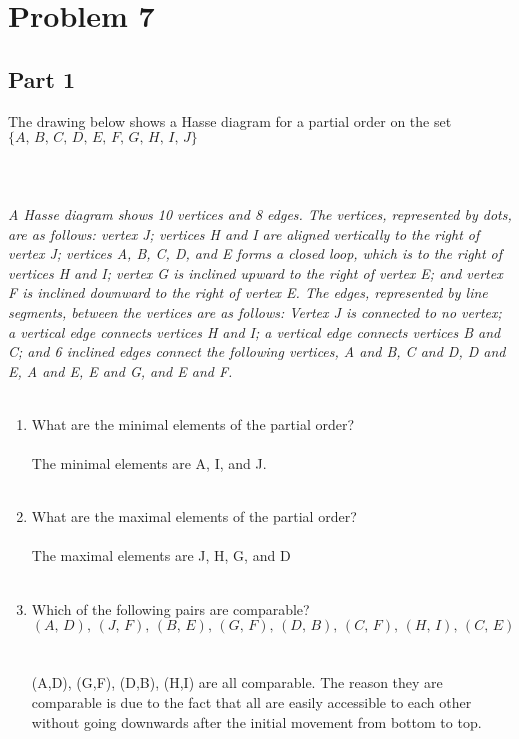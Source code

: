 \section*{Problem 7}
\subsection*{Part 1} The drawing below shows a Hasse diagram for a partial order on the set $\{A,\, B,\, C,\, D,\, E,\, F,\, G,\, H,\, I,\, J\}$
\\
\\
\\
\\
{\color{blue}{\bf Figure 3:} \emph{A Hasse diagram shows 10 vertices and 8 edges. The vertices, represented by dots, are as follows: vertex J; vertices H and I are aligned vertically to the right of vertex J; vertices A, B, C, D, and E forms a closed loop, which is to the right of vertices H and I; vertex G is inclined upward to the right of vertex E; and vertex F is inclined downward to the right of vertex E. The edges, represented by line segments, between the vertices are as follows: Vertex J is connected to no vertex; a vertical edge connects vertices H and I; a vertical edge connects vertices B and C; and 6 inclined edges connect the following vertices, A and B, C and D, D and E, A and E, E and G, and E and F.
}
}
\\
\\

\begin{enumerate}[label=(\alph*)]
\item What are the minimal elements of the partial order?\\\\
The minimal elements are A, I, and J.
\\\\

\item What are the maximal elements of the partial order?\\\\
The maximal elements are J, H, G, and D
\\\\

\item Which of the following pairs are comparable?\\
\[
(A, \,D),\, (J,\, F),\, (B,\, E),\, (G, \,F),\, (D,\, B),\, (C, \,F),\, (H,\, I), \,(C,\, E)
\]\\\\
(A,D), (G,F), (D,B), (H,I) are all comparable. The reason they are comparable is due to the fact that all are easily accessible to each other without going downwards after the initial movement from bottom to top.
\\\\

\end{enumerate}

